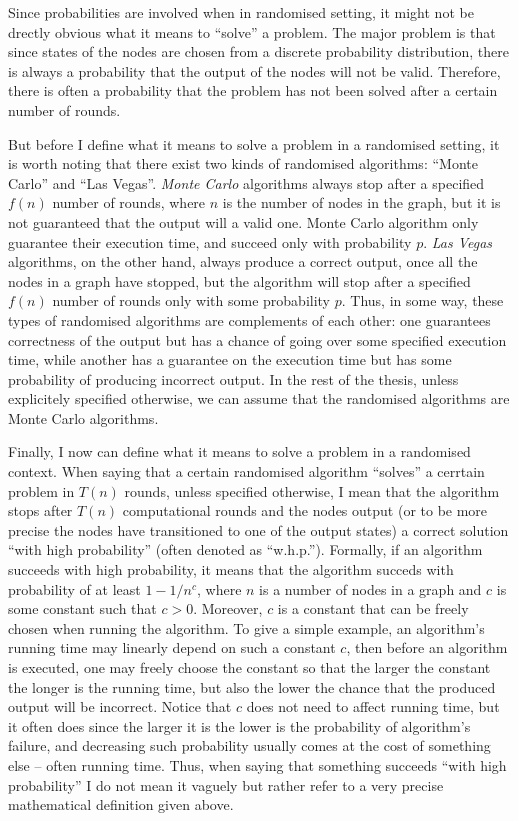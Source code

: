 Since probabilities are involved when in randomised setting, it might not be
drectly obvious what it means to ``solve'' a problem. The major problem is that
since states of the nodes are chosen from a discrete probability distribution,
there is always a probability that the output of the nodes will not be valid.
Therefore, there is often a probability that the problem has not been solved
after a certain number of rounds.

But before I define what it means to solve a problem in a randomised setting, it is
worth noting that there exist two kinds of randomised algorithms: ``Monte Carlo'' and
``Las Vegas''. \emph{Monte Carlo} algorithms always stop after a specified $f(n)$
number of rounds, where $n$ is the number of nodes in the graph, but
it is not guaranteed that the output will a valid one. Monte Carlo algorithm
only guarantee their execution time, and succeed only with probability $p$.
\emph{Las Vegas} algorithms, on the other hand, always produce a correct output,
once all the nodes in a graph have stopped, but the algorithm will stop after a
specified $f(n)$ number of rounds only with some probability $p$. Thus, in some
way, these types of randomised algorithms are complements of each other:
one guarantees correctness of the output but has a chance of going over some
specified execution time, while another has a guarantee on the execution time
but has some probability of producing incorrect output. In the rest of the thesis,
unless explicitely specified otherwise, we can assume that the randomised algorithms
are Monte Carlo algorithms.

Finally, I now can define what it means to solve a problem in a randomised context.
When saying that a certain randomised algorithm ``solves'' a cerrtain problem in
$T(n)$ rounds, unless specified otherwise, I mean that the algorithm stops after
$T(n)$ computational rounds and the nodes output (or to be more precise the nodes
have transitioned to one of the output states) a correct solution ``with high
probability'' (often denoted as ``w.h.p.''). Formally, if an algorithm succeeds with
high probability, it means that the algorithm succeds with probability of at least
$1 - 1 / n^c$, where $n$ is a number of nodes in a graph and $c$ is some constant
such that $c > 0$. Moreover, $c$ is a constant that can be freely chosen when 
running the algorithm. To give a simple example, an algorithm's running time may
linearly depend on such a constant $c$, then before an algorithm is executed,
one may freely choose the constant so that the larger the constant the longer is
the running time, but also the lower the chance that the produced output will
be incorrect. Notice that $c$ does not need to affect running time, but it often
does since the larger it is the lower is the probability of algorithm's failure,
and decreasing such probability usually comes at the cost of something else -- 
often running time. Thus, when saying that something succeeds ``with high probability''
I do not mean it vaguely but rather refer to a very precise mathematical definition
given above.

